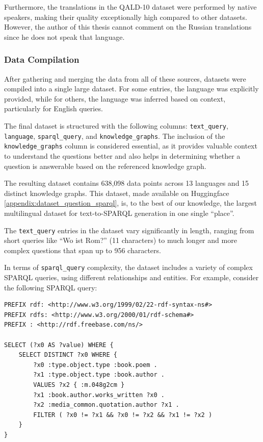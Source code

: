 Furthermore, the translations in the QALD-10 dataset were performed by native speakers, making their quality exceptionally high compared to other datasets. However, the author of this thesis cannot comment on the Russian translations since he does not speak that language.

\subsubsection{Data Compilation}
\sloppy
After gathering and merging the data from all of these sources, datasets were compiled into a single large dataset. For some entries, the language was explicitly provided, while for others, the language was inferred based on context, particularly for English queries.

The final dataset is structured with the following columns: \texttt{text\_query}, \texttt{language}, \texttt{sparql\_query}, and \texttt{knowledge\_graphs}. The inclusion of the \texttt{knowledge\_graphs} column is considered essential, as it provides valuable context to understand the questions better and also helps in determining whether a question is answerable based on the referenced knowledge graph.

The resulting dataset contains 638,098 data points across 13 languages and 15 distinct knowledge graphs. This dataset, made available on Huggingface \ref{appendix:dataset_question_sparql}, is, to the best of our knowledge, the largest multilingual dataset for text-to-SPARQL generation in one single ``place''.

The \texttt{text\_query} entries in the dataset vary significantly in length, ranging from short queries like \textquotedblleft Wo ist Rom?\textquotedblright{} (11 characters) to much longer and more complex questions that span up to 956 characters.

In terms of \texttt{sparql\_query} complexity, the dataset includes a variety of complex SPARQL queries, using different relationships and entities. For example, consider the following SPARQL query:

\begin{verbatim}
PREFIX rdf: <http://www.w3.org/1999/02/22-rdf-syntax-ns#>
PREFIX rdfs: <http://www.w3.org/2000/01/rdf-schema#>
PREFIX : <http://rdf.freebase.com/ns/>

SELECT (?x0 AS ?value) WHERE {
    SELECT DISTINCT ?x0 WHERE {
        ?x0 :type.object.type :book.poem .
        ?x1 :type.object.type :book.author .
        VALUES ?x2 { :m.048g2cm }
        ?x1 :book.author.works_written ?x0 .
        ?x2 :media_common.quotation.author ?x1 .
        FILTER ( ?x0 != ?x1 && ?x0 != ?x2 && ?x1 != ?x2 )
    }
}
\end{verbatim}

